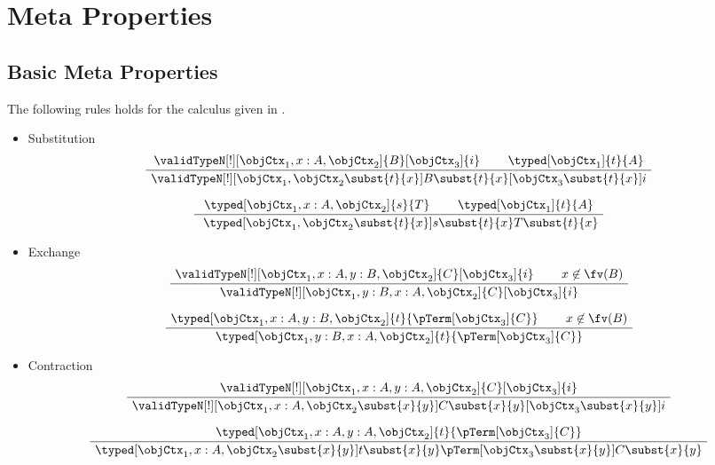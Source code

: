 \documentclass[preprint]{sigplanconf}
\begin{document}
\section{Meta Properties}
\label{app:basic-props}

\subsection{Basic Meta Properties}

\begin{proposition}
  \label{prop:derived-structural-rules}
  The following rules holds for the calculus given in .
  \begin{itemize}
  \item Substitution
    \begin{gather*}
      \AxiomC{$\validTypeN[!][\objCtx_1, x:A, \objCtx_2]{B}[\objCtx_3]{i}$}
      \AxiomC{$\typed[\objCtx_1]{t}{A}$}
      \BinaryInfC{$
        \validTypeN[!][\objCtx_1, \objCtx_2 \subst{t}{x}]
        {B \subst{t}{x}}[\objCtx_3 \subst{t}{x}]{i}$}
      \DisplayProof
      \\[7pt]
      \AxiomC{$\typed[\objCtx_1, x:A, \objCtx_2]{s}{T}$}
      \AxiomC{$\typed[\objCtx_1]{t}{A}$}
      \BinaryInfC{
        $\typed[\objCtx_1, \objCtx_2 \subst{t}{x}]
        {s \subst{t}{x}}
        {T \subst{t}{x}}$}
      \DisplayProof
    \end{gather*}
  \item Exchange
     \begin{gather*}
      \AxiomC{$\validTypeN[!][\objCtx_1, x:A, y : B, \objCtx_2]{C}[\objCtx_3]{i}$}
      \AxiomC{$x \not \in \fv(B)$}
\BinaryInfC{$
        \validTypeN[!][\objCtx_1, y : B, x:A, \objCtx_2]{C}[\objCtx_3]{i}$}
      \DisplayProof
      \\[7pt]
      \AxiomC{$
        \typed[\objCtx_1, x:A, y : B, \objCtx_2]{t}{\pTerm[\objCtx_3]{C}}$}
      \AxiomC{$x \not \in \fv(B)$}
\BinaryInfC{$\typed[\objCtx_1, y:B, x:A, \objCtx_2]
        {t}{\pTerm[\objCtx_3]{C}}$}
      \DisplayProof
    \end{gather*}
  \item Contraction
    \begin{gather*}
      \AxiomC{$\validTypeN[!][\objCtx_1, x:A, y:A, \objCtx_2]{C}[\objCtx_3]{i}$}
      \UnaryInfC{$\validTypeN[!][\objCtx_1, x:A, \objCtx_2 \subst{x}{y}]
        {C \subst{x}{y}}[\objCtx_3 \subst{x}{y}]{i}$}
      \DisplayProof
      \\[7pt]
      \AxiomC{$\typed[\objCtx_1, x:A, y:A, \objCtx_2]{t}{\pTerm[\objCtx_3]{C}}$}
      \UnaryInfC{$\typed[\objCtx_1, x:A, \objCtx_2 \subst{x}{y}]
        {t\subst{x}{y}}{\pTerm[\objCtx_3 \subst{x}{y}]{C \subst{x}{y}}}$}
      \DisplayProof
    \end{gather*}
  \end{itemize}
\end{proposition}
\end{document}
